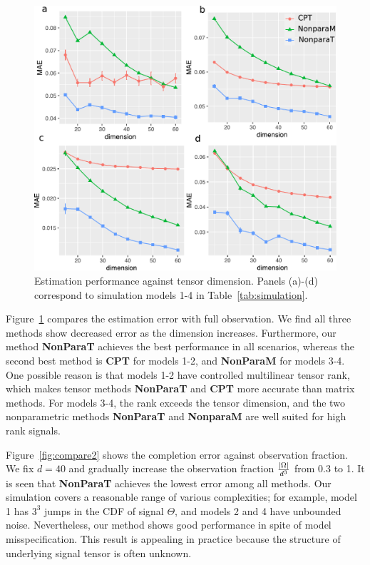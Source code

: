\documentclass{article}
\theoremstyle{plain}
\theoremstyle{definition}
\begin{document}
\begin{figure}[h!]
\includegraphics[width=.45\textwidth]{figure/fig1-4.pdf}
\vspace{-.4cm}
\caption{Estimation performance against tensor dimension. Panels (a)-(d) correspond to simulation models 1-4 in Table~\ref{tab:simulation}.}\label{fig:compare1}
\vspace{-.2cm}
\end{figure}


Figure~\ref{fig:compare1} compares the estimation error with full observation. We find all three methods show decreased error as the dimension increases. Furthermore, our method {\bf NonParaT} achieves the best performance in all scenarios, whereas the second best method is {\bf CPT} for models 1-2, and {\bf NonParaM} for models 3-4. One possible reason is that models 1-2 have controlled multilinear tensor rank, which makes tensor methods {\bf NonParaT} and {\bf CPT} more accurate than matrix methods. For models 3-4, the rank exceeds the tensor dimension, and the two nonparametric methods {\bf NonParaT} and {\bf NonparaM} are well suited for high rank signals. 



Figure~\ref{fig:compare2} shows the completion error against observation fraction. We fix $d=40$ and gradually increase the observation fraction ${|\Omega|\over d^3}$ from 0.3 to 1. It is seen that {\bf NonParaT} achieves the lowest error among all methods. Our simulation covers a reasonable range of various complexities; %
for example, model 1 has $3^3$ jumps in the CDF of signal $\Theta$, and models 2 and 4 have unbounded noise. Nevertheless, our method shows good performance in spite of model misspecification. This result is appealing in practice because the structure of underlying signal tensor is often unknown. 
\end{document}
